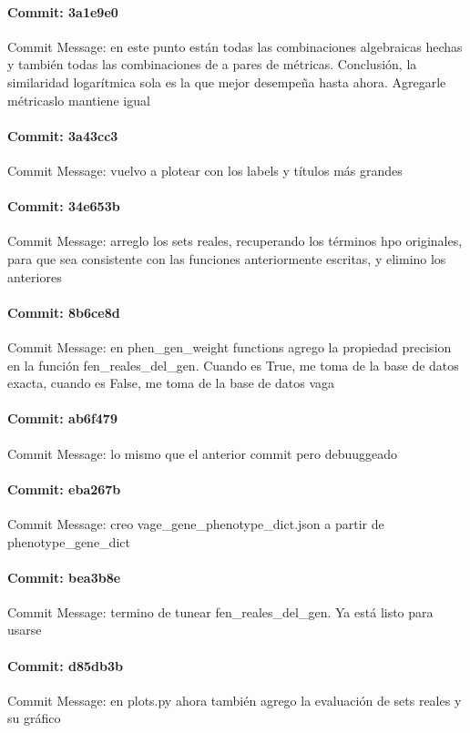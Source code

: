 \documentclass{article}
\begin{document}
\paragraph{Commit: 3a1e9e0}
Commit Message: en este punto están todas las combinaciones algebraicas hechas y también todas las combinaciones de a pares de métricas. Conclusión, la similaridad logarítmica sola es la que mejor desempeña hasta ahora. Agregarle métricaslo mantiene igual

\paragraph{Commit: 3a43cc3}
Commit Message: vuelvo a plotear con los labels y títulos más grandes

\paragraph{Commit: 34e653b}
Commit Message: arreglo los sets reales, recuperando los términos hpo originales, para que sea consistente con las funciones anteriormente escritas, y elimino los anteriores

\paragraph{Commit: 8b6ce8d}
Commit Message: en phen_gen_weight functions agrego la propiedad precision en la función fen_reales_del_gen. Cuando es True, me toma de la base de datos exacta, cuando es False, me toma de la base de datos vaga

\paragraph{Commit: ab6f479}
Commit Message: lo mismo que el anterior commit pero debuuggeado

\paragraph{Commit: eba267b}
Commit Message: creo vage_gene_phenotype_dict.json a partir de phenotype_gene_dict

\paragraph{Commit: bea3b8e}
Commit Message: termino de tunear fen_reales_del_gen. Ya está listo para usarse

\paragraph{Commit: d85db3b}
Commit Message: en plots.py ahora también agrego la evaluación de sets reales y su gráfico
\end{document}
